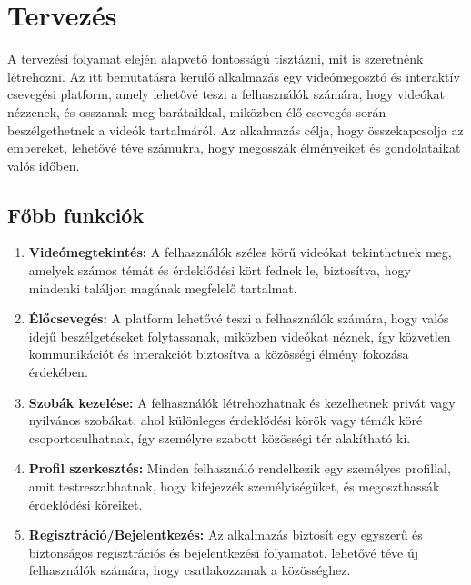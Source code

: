 \chapter{Tervez\'es}\label{chapter:tervezes}
A tervezési folyamat elején alapvető fontosságú tisztázni, mit is szeretnénk létrehozni. Az itt bemutatásra kerülő alkalmazás egy videómegosztó és interaktív csevegési platform, amely lehetővé teszi a felhasználók számára, hogy videókat nézzenek, és osszanak meg barátaikkal, miközben élő csevegés során beszélgethetnek a videók tartalmáról. Az alkalmazás célja, hogy összekapcsolja az embereket, lehetővé téve számukra, hogy megosszák élményeiket és gondolataikat valós időben.


\section{Főbb funkciók}

\begin{enumerate}
  \item \textbf{Videómegtekintés:} A felhasználók széles körű videókat tekinthetnek meg, amelyek számos témát és érdeklődési kört fednek le, biztosítva, hogy mindenki találjon magának megfelelő tartalmat.
  
  \item \textbf{Élőcsevegés:} A platform lehetővé teszi a felhasználók számára, hogy valós idejű beszélgetéseket folytassanak, miközben videókat néznek, így közvetlen kommunikációt és interakciót biztosítva a közösségi élmény fokozása érdekében.
  
  \item \textbf{Szobák kezelése:} A felhasználók létrehozhatnak és kezelhetnek privát vagy nyilvános szobákat, ahol különleges érdeklődési körök vagy témák köré csoportosulhatnak, így személyre szabott közösségi tér alakítható ki.
  
  \item \textbf{Profil szerkesztés:} Minden felhasználó rendelkezik egy személyes profillal, amit testreszabhatnak, hogy kifejezzék személyiségüket, és megoszthassák érdeklődési köreiket.
  
  \item \textbf{Regisztráció/Bejelentkezés:} Az alkalmazás biztosít egy egyszerű és biztonságos regisztrációs és bejelentkezési folyamatot, lehetővé téve új felhasználók számára, hogy csatlakozzanak a közösséghez.
\end{enumerate}


